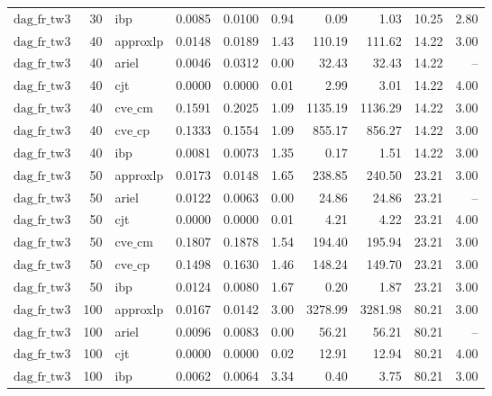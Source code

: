 \begin{table}[ht]
\begin{tabular}{lrlrrrrrrr}
$\text{dag\_fr\_tw3}$ & 30 & ibp & 0.0085 & 0.0100 & 0.94 & 0.09 & 1.03 & 10.25 & 2.80 \\
$\text{dag\_fr\_tw3}$ & 40 & approxlp & 0.0148 & 0.0189 & 1.43 & 110.19 & 111.62 & 14.22 & 3.00 \\
$\text{dag\_fr\_tw3}$ & 40 & ariel & 0.0046 & 0.0312 & 0.00 & 32.43 & 32.43 & 14.22 & -- \\
$\text{dag\_fr\_tw3}$ & 40 & cjt & 0.0000 & 0.0000 & 0.01 & 2.99 & 3.01 & 14.22 & 4.00 \\
$\text{dag\_fr\_tw3}$ & 40 & $\text{cve\_cm}$ & 0.1591 & 0.2025 & 1.09 & 1135.19 & 1136.29 & 14.22 & 3.00 \\
$\text{dag\_fr\_tw3}$ & 40 & $\text{cve\_cp}$ & 0.1333 & 0.1554 & 1.09 & 855.17 & 856.27 & 14.22 & 3.00 \\
$\text{dag\_fr\_tw3}$ & 40 & ibp & 0.0081 & 0.0073 & 1.35 & 0.17 & 1.51 & 14.22 & 3.00 \\
$\text{dag\_fr\_tw3}$ & 50 & approxlp & 0.0173 & 0.0148 & 1.65 & 238.85 & 240.50 & 23.21 & 3.00 \\
$\text{dag\_fr\_tw3}$ & 50 & ariel & 0.0122 & 0.0063 & 0.00 & 24.86 & 24.86 & 23.21 & -- \\
$\text{dag\_fr\_tw3}$ & 50 & cjt & 0.0000 & 0.0000 & 0.01 & 4.21 & 4.22 & 23.21 & 4.00 \\
$\text{dag\_fr\_tw3}$ & 50 & $\text{cve\_cm}$ & 0.1807 & 0.1878 & 1.54 & 194.40 & 195.94 & 23.21 & 3.00 \\
$\text{dag\_fr\_tw3}$ & 50 & $\text{cve\_cp}$ & 0.1498 & 0.1630 & 1.46 & 148.24 & 149.70 & 23.21 & 3.00 \\
$\text{dag\_fr\_tw3}$ & 50 & ibp & 0.0124 & 0.0080 & 1.67 & 0.20 & 1.87 & 23.21 & 3.00 \\
$\text{dag\_fr\_tw3}$ & 100 & approxlp & 0.0167 & 0.0142 & 3.00 & 3278.99 & 3281.98 & 80.21 & 3.00 \\
$\text{dag\_fr\_tw3}$ & 100 & ariel & 0.0096 & 0.0083 & 0.00 & 56.21 & 56.21 & 80.21 & -- \\
$\text{dag\_fr\_tw3}$ & 100 & cjt & 0.0000 & 0.0000 & 0.02 & 12.91 & 12.94 & 80.21 & 4.00 \\
$\text{dag\_fr\_tw3}$ & 100 & ibp & 0.0062 & 0.0064 & 3.34 & 0.40 & 3.75 & 80.21 & 3.00 \\
\bottomrule
\end{tabular}
\end{table}
